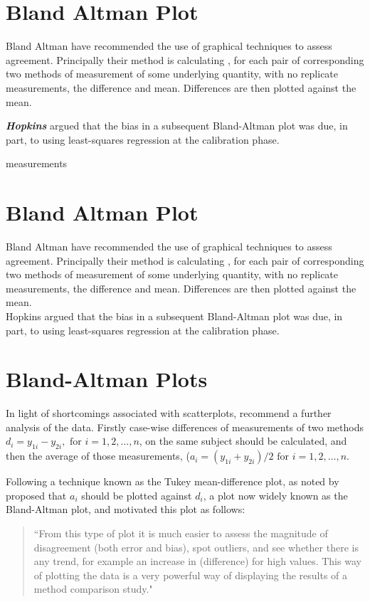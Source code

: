 \documentclass[12pt, a4paper]{report}
\theoremstyle{plain}
\theoremstyle{definition}
\theoremstyle{remark}
\begin{document}
	
	
	\section{Bland Altman Plot}
	Bland Altman have recommended the use of graphical techniques to
	assess agreement. Principally their method is calculating , for
	each pair of corresponding two methods of measurement of some
	underlying quantity, with no replicate measurements, the
	difference and mean. Differences are then plotted against the
	mean.
	
	\textbf{\textit{Hopkins}} argued that the bias in a subsequent Bland-Altman plot was
	due, in part, to using least-squares regression at the calibration
	phase.
	
	


	measurements\section{Bland Altman Plot} Bland Altman have
	recommended the use of graphical techniques to assess agreement.
	Principally their method is calculating , for each pair of
	corresponding two methods of measurement of some underlying
	quantity, with no replicate measurements, the difference and mean.
	Differences are then plotted against the mean.
	\\
	Hopkins argued that the bias in a subsequent Bland-Altman plot was
	due, in part, to using least-squares regression at the calibration
	phase.



	\section{Bland-Altman Plots}
	
	In light of shortcomings associated with scatterplots,
	\citet*{BA83} recommend a further analysis of the data. Firstly
	case-wise differences of measurements of two methods $d_{i} =
	y_{1i}-y_{2i}, \mbox{ for }i=1,2,\dots,n$, on the same subject
	should be calculated, and then the average of those measurements, 
	($a_{i} = (y_{1i} + y_{2i})/2 \mbox{ for }i=1,2,\dots, n$.
	
	Following a technique known as the Tukey mean-difference plot, as noted by \citet{kozak2014including}
	\citet{BA83} proposed that $a_i$ should be plotted against $d_i$, a plot now widely known as the Bland-Altman plot, and motivated this plot as follows:
	\begin{quote}
		``From this type of plot it is much easier to assess the magnitude
		of disagreement (both error and bias), spot outliers, and see
		whether there is any trend, for example an increase in (difference) for high values. This way of plotting the data is a very powerful way of displaying the results of a method comparison study."
	\end{quote}
	
\end{document}
